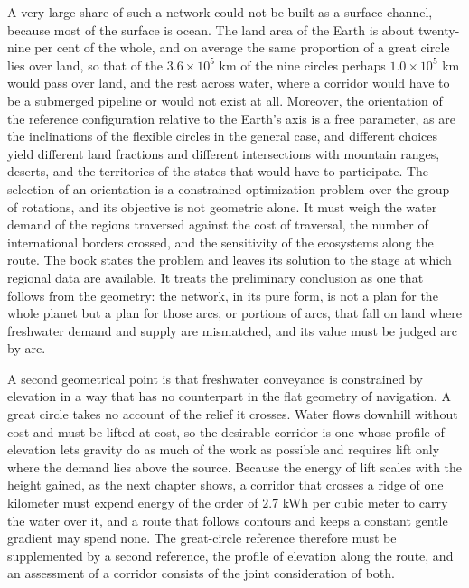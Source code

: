 A very large share of such a network could not be built as a surface channel, because most of the surface is ocean. The land area of the Earth is about twenty-nine per cent of the whole, and on average the same proportion of a great circle lies over land, so that of the $3.6\times10^5$ km of the nine circles perhaps $1.0\times10^5$ km would pass over land, and the rest across water, where a corridor would have to be a submerged pipeline or would not exist at all. Moreover, the orientation of the reference configuration relative to the Earth's axis is a free parameter, as are the inclinations of the flexible circles in the general case, and different choices yield different land fractions and different intersections with mountain ranges, deserts, and the territories of the states that would have to participate. The selection of an orientation is a constrained optimization problem over the group of rotations, and its objective is not geometric alone. It must weigh the water demand of the regions traversed against the cost of traversal, the number of international borders crossed, and the sensitivity of the ecosystems along the route. The book states the problem and leaves its solution to the stage at which regional data are available. It treats the preliminary conclusion as one that follows from the geometry: the network, in its pure form, is not a plan for the whole planet but a plan for those arcs, or portions of arcs, that fall on land where freshwater demand and supply are mismatched, and its value must be judged arc by arc.

A second geometrical point is that freshwater conveyance is constrained by elevation in a way that has no counterpart in the flat geometry of navigation. A great circle takes no account of the relief it crosses. Water flows downhill without cost and must be lifted at cost, so the desirable corridor is one whose profile of elevation lets gravity do as much of the work as possible and requires lift only where the demand lies above the source. Because the energy of lift scales with the height gained, as the next chapter shows, a corridor that crosses a ridge of one kilometer must expend energy of the order of $2.7$ kWh per cubic meter to carry the water over it, and a route that follows contours and keeps a constant gentle gradient may spend none. The great-circle reference therefore must be supplemented by a second reference, the profile of elevation along the route, and an assessment of a corridor consists of the joint consideration of both.

